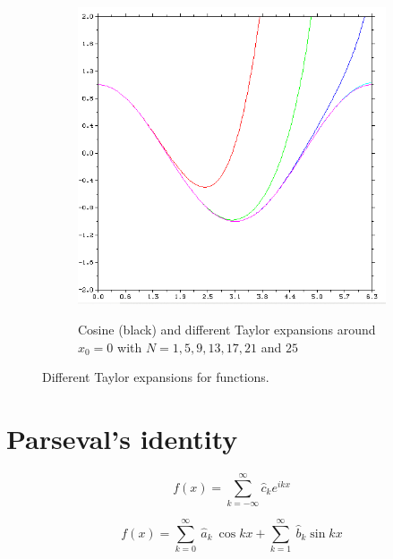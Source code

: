 \begin{figure}
    \centering
    \begin{subfigure}[h]{0.5\textwidth}
        \centering
        \includegraphics[width = \textwidth]{./doc/Figures/Taylor3.png}  \\
        \caption{Cosine (black) and different Taylor expansions around $x_0 = 0$ with $N = 1, 5, 9, 13, 17, 21$ and $25$}
        \label{fig:Taylor3}
    \end{subfigure}
    \caption{Different Taylor expansions for functions.}   \label{fig:Taylor}
\end{figure}


  
   

\section{Parseval's identity} 





\begin{equation} 
	f ( x)  =  \sum_{k=-\infty} ^{\infty}  \hat{c}_k  e^{ i k x }
\end{equation} 

\begin{equation} 
	f ( x)  =  \sum_{k=0} ^{\infty} \  \hat{a}_k  \ \cos k x + \sum_{k=1} ^{\infty} \  \hat{b}_k  \sin k x
\end{equation} 	

